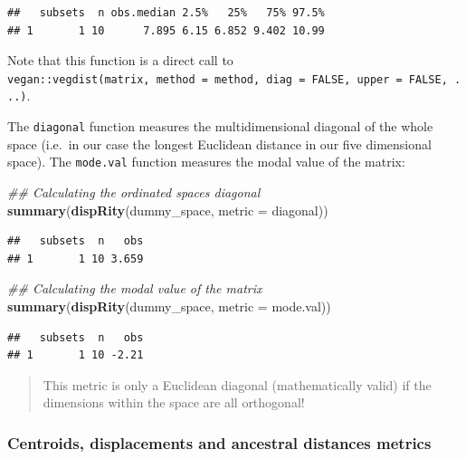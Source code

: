 \documentclass[
]{book}
\newenvironment{Shaded}{\begin{snugshade}}{\end{snugshade}}
\newcommand{\CommentTok}[1]{\textcolor[rgb]{0.56,0.35,0.01}{\textit{#1}}}
\newcommand{\DataTypeTok}[1]{\textcolor[rgb]{0.13,0.29,0.53}{#1}}
\newcommand{\KeywordTok}[1]{\textcolor[rgb]{0.13,0.29,0.53}{\textbf{#1}}}
\newcommand{\NormalTok}[1]{#1}
\begin{document}
\begin{verbatim}
##   subsets  n obs.median 2.5%   25%   75% 97.5%
## 1       1 10      7.895 6.15 6.852 9.402 10.99
\end{verbatim}

Note that this function is a direct call to \texttt{vegan::vegdist(matrix,\ method\ =\ method,\ diag\ =\ FALSE,\ upper\ =\ FALSE,\ ...)}.

The \texttt{diagonal} function measures the multidimensional diagonal of the whole space (i.e.~in our case the longest Euclidean distance in our five dimensional space).
The \texttt{mode.val} function measures the modal value of the matrix:

\begin{Shaded}
\begin{Highlighting}[]
\CommentTok{\#\# Calculating the ordinated space\textquotesingle{}s diagonal}
\KeywordTok{summary}\NormalTok{(}\KeywordTok{dispRity}\NormalTok{(dummy\_space, }\DataTypeTok{metric =}\NormalTok{ diagonal))}
\end{Highlighting}
\end{Shaded}

\begin{verbatim}
##   subsets  n   obs
## 1       1 10 3.659
\end{verbatim}

\begin{Shaded}
\begin{Highlighting}[]
\CommentTok{\#\# Calculating the modal value of the matrix}
\KeywordTok{summary}\NormalTok{(}\KeywordTok{dispRity}\NormalTok{(dummy\_space, }\DataTypeTok{metric =}\NormalTok{ mode.val))}
\end{Highlighting}
\end{Shaded}

\begin{verbatim}
##   subsets  n   obs
## 1       1 10 -2.21
\end{verbatim}

\begin{quote}
This metric is only a Euclidean diagonal (mathematically valid) if the dimensions within the space are all orthogonal!
\end{quote}

\hypertarget{centroids}{%
\subsubsection{Centroids, displacements and ancestral distances metrics}\label{centroids}}
\end{document}
